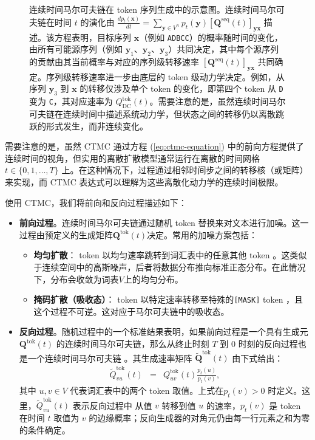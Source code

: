 \begin{figure}[!t]
\centering
{}
\caption{连续时间马尔可夫链在 token 序列生成中的示意图。连续时间马尔可夫链在时间 $t$ 的演化由 $\frac{d p_t(\mathbf{x})}{dt} = \sum_{\mathbf{y} \in V^n} p_t(\mathbf{y}) [\mathbf{Q}^{\mathrm{seq}}(t)]_{\mathbf{y}\mathbf{x}}$ 描述。该方程表明，目标序列 $\mathbf{x}$（例如 \texttt{ADBCC}）的概率随时间的变化，由所有可能源序列（例如 $\mathbf{y}_1$、$\mathbf{y}_2$、$\mathbf{y}_3$）共同决定，其中每个源序列的贡献由其当前概率与对应的序列级转移速率 $[\mathbf{Q}^{\mathrm{seq}}(t)]_{\mathbf{y}\mathbf{x}}$ 共同确定。序列级转移速率进一步由底层的 token 级动力学决定。例如，从序列 $\mathbf{y}_3$ 到 $\mathbf{x}$ 的转移仅涉及单个 token 的变化，即第四个 token 从 \texttt{D} 变为 \texttt{C}，其对应速率为 $Q^{\mathrm{tok}}_{\mathrm{DC}}(t)$。需要注意的是，虽然连续时间马尔可夫链在连续时间中描述系统动力学，但状态之间的转移仍以离散跳跃的形式发生，而非连续变化。}
\label{fig:ctmc-for-sequence-generation}
\end{figure}

需要注意的是，虽然 CTMC 通过方程 (\ref{eq:ctmc-equation}) 中的前向方程提供了连续时间的视角，但实用的离散扩散模型通常运行在离散的时间网格 $t \in \{0,1,\dots,T\}$ 上。在这种情况下，过程通过相邻时间步之间的转移核（或矩阵）来实现，而 CTMC 表达式可以理解为这些离散化动力学的连续时间极限。

使用 CTMC，我们将前向和反向过程描述如下：

\begin{itemize}
\item \textbf{前向过程}。连续时间马尔可夫链通过随机 token 替换来对文本进行加噪。这一过程由预定义的生成矩阵$\mathbf{Q}^{\mathrm{tok}}(t)$决定。常用的加噪方案包括：
    \begin{itemize}
    \item \textbf{均匀扩散}： token 以均匀速率跳转到词汇表中的任意其他 token 。这类似于连续空间中的高斯噪声，后者将数据分布推向标准正态分布。在此情况下，分布会收敛为词表$V$上的均匀分布。
    \item \textbf{掩码扩散（吸收态）}： token 以特定速率转移至特殊的\texttt{[MASK]} token ，且这个过程不可逆。这对应于马尔可夫链中的吸收态。
    \end{itemize}
\item \textbf{反向过程}。随机过程中的一个标准结果表明，如果前向过程是一个具有生成元 $\mathbf{Q}^{\mathrm{tok}}(t)$ 的连续时间马尔可夫链，那么从终止时刻 $T$ 到 $0$ 时刻的反向过程也是一个连续时间马尔可夫链 \citep{anderson:1982reverse}。其生成速率矩阵 $\tilde{\mathbf{Q}}^{\mathrm{tok}}(t)$ 由下式给出：
\begin{eqnarray}
\tilde{Q}^{\mathrm{tok}}_{vu}(t) & = & Q^{\mathrm{tok}}_{uv}(t) \frac{p_t(u)}{p_t(v)}, \label{eq:reverse-ctmc}
\end{eqnarray}
\noindent 其中 $u, v \in V$ 代表词汇表中的两个 token 取值。上式在$p_t(v)>0$ 时定义。这里，$\tilde{Q}^{\mathrm{tok}}_{vu}(t)$ 表示反向过程中
从值 $v$ 转移到值 $u$ 的速率，$p_t(v)$ 是 token 在时间 $t$ 取值为 $v$
的边缘概率；反向生成器的对角元仍由每一行元素之和为零的条件确定。
\end{itemize}

